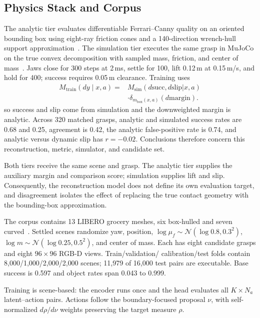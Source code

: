 \documentclass[letterpaper, 10pt, conference]{ieeeconf}
\newcommand{\suff}{\mathrm{succ}}
\begin{document}
\subsection{Physics Stack and Corpus}
The analytic tier evaluates differentiable Ferrari--Canny quality on an
oriented bounding box using eight-ray friction cones and a 140-direction
wrench-hull support approximation~\cite{ferrari1992planning}. The simulation
tier executes the same grasp in MuJoCo on the true convex decomposition with
sampled mass, friction, and center of mass~\cite{todorov2012}. Jaws close for
300 steps at 2\,ms, settle for 100, lift 0.12\,m at 0.15\,m/s, and hold for
400; success requires 0.05\,m clearance. Training uses
\begin{equation}
\begin{aligned}
M_{\mathrm{train}}(dy\mid x,a)={}&
M_{\mathrm{sim}}(d\suff,d\mathrm{slip}|x,a)\\
&\cdot\delta_{m_{\mathrm{box}}(x,a)}(d\mathrm{margin}).
\end{aligned}
\label{eq:hybridkernel}
\end{equation}
so success and slip come from simulation and the downweighted margin is
analytic. Across 320 matched grasps, analytic and simulated success rates are
0.68 and 0.25, agreement is 0.42, the analytic false-positive rate is 0.74,
and analytic versus dynamic slip has $r=-0.02$. Conclusions therefore concern
this reconstruction, metric, simulator, and candidate set.

Both tiers receive the same scene and grasp. The analytic tier supplies the
auxiliary margin and comparison score; simulation supplies lift and slip.
Consequently, the reconstruction model does not define its own evaluation
target, and disagreement isolates the effect of replacing the true contact
geometry with the bounding-box approximation.

The corpus contains 13 LIBERO grocery meshes, six box-hulled and seven
curved~\cite{liu2023libero}. Settled scenes randomize yaw, position,
$\log\mu_f\sim\mathcal N(\log0.8,0.3^2)$,
$\log m\sim\mathcal N(\log0.25,0.5^2)$, and center of mass. Each has eight
candidate grasps and eight $96\times96$ RGB-D views. Train/validation/
calibration/test folds contain 8{,}000/1{,}000/2{,}000/2{,}000 scenes; 11{,}979
of 16{,}000 test pairs are executable. Base success is 0.597 and object rates
span 0.043 to 0.999.

Training is scene-based: the encoder runs once and the head evaluates all
$K\times N_a$ latent--action pairs. Actions follow the boundary-focused
proposal $\nu$, with self-normalized $d\rho/d\nu$ weights preserving the
target measure $\rho$.
\end{document}
